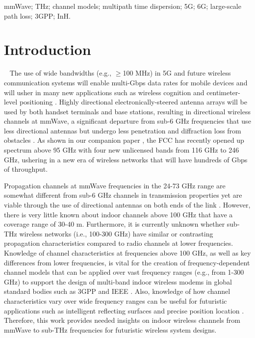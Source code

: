 \documentclass[conference]{IEEEtran}
\begin{document}
\begin{IEEEkeywords}                            
mmWave; THz; channel models; multipath time dispersion; 5G; 6G; large-scale path loss; 3GPP; InH.
\end{IEEEkeywords}

\section{Introduction}~\label{sec:intro}
The use of wide bandwidths (e.g., $\geq$100 MHz) in 5G and future wireless communication systems will enable multi-Gbps data rates for mobile devices and will usher in many new applications such as wireless cognition and centimeter-level positioning \cite{xing21a,rappaport19access,Kanhere20a}. Highly directional electronically-steered antenna arrays will be used by both handset terminals and base stations, resulting in directional wireless channels at mmWave, a significant departure from sub-6 GHz frequencies that use less directional antennas but undergo less penetration and diffraction loss from obstacles \cite{xing21a,rappaport19access,rappaport2013millimeter}. As shown in our companion paper \cite{xing21a}, the FCC has recently opened up spectrum above 95 GHz with four new unlicensed bands from 116 GHz to 246 GHz, ushering in a new era of wireless networks that will have hundreds of Gbps of throughput.

Propagation channels at mmWave frequencies in the 24-73 GHz range are somewhat different from sub-6 GHz channels in transmission properties yet are viable through the use of directional antennas on both ends of the link \cite{rappaport2013millimeter,Haneda16a,Ju20a,Sun14b,xing19GC,Sun16b}. However, there is very little known about indoor channels above 100 GHz that have a coverage range of 30-40 m. Furthermore, it is currently unknown whether sub-THz wireless networks (i.e., 100-300 GHz) have similar or contrasting propagation characteristics compared to radio channels at lower frequencies. Knowledge of channel characteristics at frequencies above 100 GHz, as well as key differences from lower frequencies, is vital for the creation of frequency-dependent channel models that can be applied over vast frequency ranges (e.g., from 1-300 GHz) to support the design of multi-band indoor wireless modems in global standard bodies such as 3GPP and IEEE \cite{3GPP2019}. Also, knowledge of how channel characteristics vary over wide frequency ranges can be useful for futuristic applications such as intelligent reflecting surfaces \cite{wu20IRS} and precise position location \cite{Kanhere20a}. Therefore, this work provides needed insights on indoor wireless channels from mmWave to sub-THz frequencies for futuristic wireless system designs. 
\end{document}
